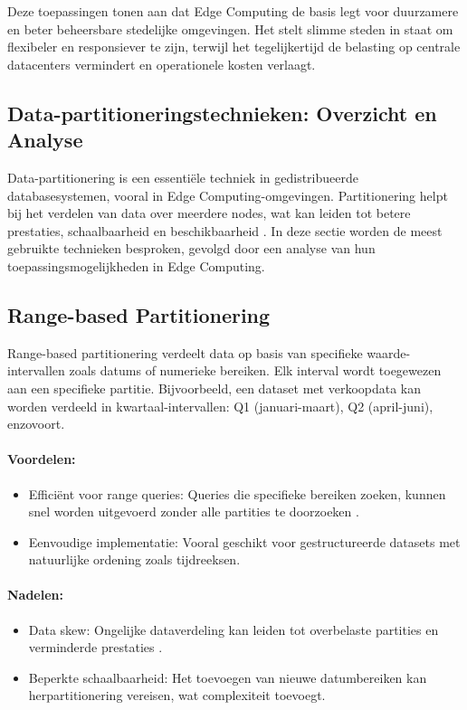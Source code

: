 Deze toepassingen tonen aan dat Edge Computing de basis legt voor duurzamere en beter beheersbare stedelijke omgevingen. Het stelt slimme steden in staat om flexibeler en responsiever te zijn, terwijl het tegelijkertijd de belasting op centrale datacenters vermindert en operationele kosten verlaagt.
 
\subsection{Data-partitioneringstechnieken: Overzicht en Analyse}

Data-partitionering is een essentiële techniek in gedistribueerde databasesystemen, vooral in Edge Computing-omgevingen. Partitionering helpt bij het verdelen van data over meerdere nodes, wat kan leiden tot betere prestaties, schaalbaarheid en beschikbaarheid \autocite{Karger1997}.
In deze sectie worden de meest gebruikte technieken besproken, gevolgd door een analyse van hun toepassingsmogelijkheden in Edge Computing.

\subsection{Range-based Partitionering}
Range-based partitionering verdeelt data op basis van specifieke waarde-intervallen zoals datums of numerieke bereiken. Elk interval wordt toegewezen aan een specifieke partitie. Bijvoorbeeld, een dataset met verkoopdata kan worden verdeeld in kwartaal-intervallen: Q1 (januari-maart), Q2 (april-juni), enzovoort.
 
\paragraph{Voordelen:}
\begin{itemize}
    \item Efficiënt voor range queries: Queries die specifieke bereiken zoeken, kunnen snel worden uitgevoerd zonder alle partities te doorzoeken \autocite{Ponnusamy2024,Mahmud2020}.
    \item Eenvoudige implementatie: Vooral geschikt voor gestructureerde datasets met natuurlijke ordening zoals tijdreeksen.
\end{itemize}
 
\paragraph{Nadelen:}
\begin{itemize}
    \item Data skew: Ongelijke dataverdeling kan leiden tot overbelaste partities en verminderde prestaties \autocite{Mahmud2020}.
    \item Beperkte schaalbaarheid: Het toevoegen van nieuwe datumbereiken kan herpartitionering vereisen, wat complexiteit toevoegt.
\end{itemize}
 
